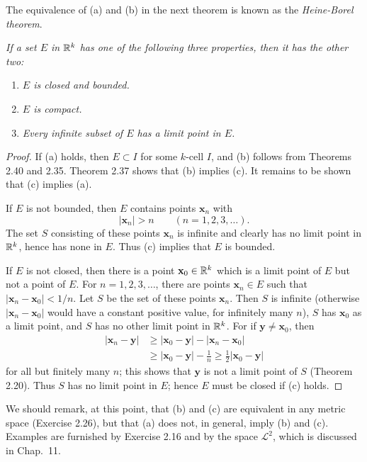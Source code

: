 The equivalence of (a) and (b) in the next theorem is known as the
\emph{Heine-Borel theorem}.

\emph{If a set $E$ in $\mathbb{R}^k$ has one of the following three properties, then it
has the other two:}
\begin{enumerate}[label=(\alph*), leftmargin=2.2em, itemsep=1pt, topsep=3pt]
  \item \emph{$E$ is closed and bounded.}
  \item \emph{$E$ is compact.}
  \item \emph{Every infinite subset of $E$ has a limit point in $E$.}
\end{enumerate}

\begin{proof}
If (a) holds, then $E \subset I$ for some $k$-cell $I$, and (b) follows from
Theorems 2.40 and 2.35. Theorem 2.37 shows that (b) implies (c). It remains to
be shown that (c) implies (a).

If $E$ is not bounded, then $E$ contains points $\mathbf{x}_n$ with
\[ |\mathbf{x}_n| > n \qquad (n = 1,2,3,\dots). \]
The set $S$ consisting of these points $\mathbf{x}_n$ is infinite and clearly
has no limit point in $\mathbb{R}^k$, hence has none in $E$. Thus (c) implies that $E$
is bounded.

If $E$ is not closed, then there is a point $\mathbf{x}_0 \in \mathbb{R}^k$ which is a
limit point of $E$ but not a point of $E$. For $n = 1,2,3,\dots$, there are
points $\mathbf{x}_n \in E$ such that $|\mathbf{x}_n-\mathbf{x}_0| < 1/n$. Let
$S$ be the set of these points $\mathbf{x}_n$. Then $S$ is infinite (otherwise
$|\mathbf{x}_n-\mathbf{x}_0|$ would have a constant positive value, for
infinitely many $n$), $S$ has $\mathbf{x}_0$ as a limit point, and $S$ has no
other limit point in $\mathbb{R}^k$. For if $\mathbf{y} \ne \mathbf{x}_0$, then
\begin{align*}
  |\mathbf{x}_n-\mathbf{y}| &\ge |\mathbf{x}_0-\mathbf{y}|
    - |\mathbf{x}_n-\mathbf{x}_0|\\
  &\ge |\mathbf{x}_0-\mathbf{y}| - \frac1n
    \ge \tfrac12|\mathbf{x}_0-\mathbf{y}|
\end{align*}
for all but finitely many $n$; this shows that $\mathbf{y}$ is not a limit
point of $S$ (Theorem 2.20). Thus $S$ has no limit point in $E$; hence $E$ must
be closed if (c) holds.
\end{proof}

We should remark, at this point, that (b) and (c) are equivalent in any metric
space (Exercise 2.26), but that (a) does not, in general, imply (b) and (c).
Examples are furnished by Exercise 2.16 and by the space $\mathscr{L}^2$, which
is discussed in Chap.\ 11.

